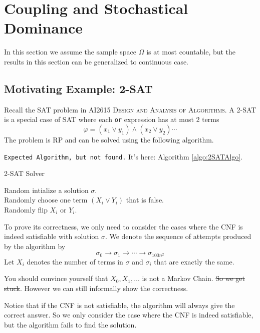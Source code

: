 \section{Coupling and Stochastical Dominance}
In this section we assume the sample space $\Omega$ is at most countable, but the results in this section can be generalized to continuous case.

    \subsection{Motivating Example: 2-SAT}
        Recall the SAT problem in \textsc{AI2615 Design and Analysis of Algorithms}. A 2-SAT is a special case of SAT where each \verb|or| expression has at most 2 terms
        \[ \varphi = (x_1 \vee y_1) \wedge (x_2 \vee y_2) \cdots \]
        The problem is RP and can be solved using the following algorithm.

        \verb|Expected Algorithm, but not found.| It's here: Algorithm \ref{algo:2SATAlgo}.

        \begin{algorithm}
            \caption{2-SAT Solver}
            Random intialize a solution $\sigma$.\\
            {
                {
                    \KwRet{$\sigma$}
                }
                \Else
                {
                    Randomly choose one term $(X_i \vee Y_i)$ that is false.\\
                    Randomly flip $X_i$ or $Y_i$.
                }
            }
            \label{algo:2SATAlgo}
        \end{algorithm}

        To prove its correctness, we only need to consider the cases where the CNF is indeed satisfiable with solution $\sigma$. We denote the sequence of attempts produced by the algorithm by
        \[ \sigma_0 \to \sigma_1 \to \cdots \to \sigma_{100n^2} \]
        Let $X_i$ denotes the number of terms in $\sigma$ and $\sigma_i$ that are exactly the same.

        You should convince yourself that $X_0, X_1, \dots$ is not a Markov Chain. \sout{So we get stuck}. However we can still informally show the correctness.

        Notice that if the CNF is not satisfiable, the algorithm will always give the correct answer. So we only consider the case where the CNF is indeed satisfiable, but the algorithm fails to find the solution.

